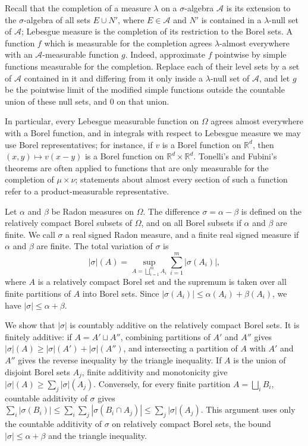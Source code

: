 Recall that the completion of a measure $\lambda$ on a $\sigma$-algebra $\mathcal A$ is its extension to the $\sigma$-algebra of all sets $E\cup N'$, where $E\in\mathcal A$ and $N'$ is contained in a $\lambda$-null set of $\mathcal A$; Lebesgue measure is the completion of its restriction to the Borel sets. A function $f$ which is measurable for the completion agrees $\lambda$-almost everywhere with an $\mathcal A$-measurable function $g$. Indeed, approximate $f$ pointwise by simple functions measurable for the completion. Replace each of their level sets by a set of $\mathcal A$ contained in it and differing from it only inside a $\lambda$-null set of $\mathcal A$, and let $g$ be the pointwise limit of the modified simple functions outside the countable union of these null sets, and $0$ on that union.

In particular, every Lebesgue measurable function on $\Omega$ agrees almost everywhere with a Borel function, and in integrals with respect to Lebesgue measure we may use Borel representatives; for instance, if $v$ is a Borel function on $\mathbb R^d$, then $(x,y)\mapsto v(x-y)$ is a Borel function on $\mathbb R^d\times\mathbb R^d$. Tonelli's and Fubini's theorems are often applied to functions that are only measurable for the completion of $\mu\times\nu$; statements about almost every section of such a function refer to a product-measurable representative.

Let $\alpha$ and $\beta$ be Radon measures on $\Omega$. The difference $\sigma=\alpha-\beta$ is defined on the relatively compact Borel subsets of $\Omega$, and on all Borel subsets if $\alpha$ and $\beta$ are finite. We call $\sigma$ a real signed Radon measure, and a finite real signed measure if $\alpha$ and $\beta$ are finite. The total variation of $\sigma$ is
\[
 |\sigma|(A)=\sup_{A=\bigsqcup_{i=1}^m A_i}\sum_{i=1}^m|\sigma(A_i)|,
\]
where $A$ is a relatively compact Borel set and the supremum is taken over all finite partitions of $A$ into Borel sets. Since $|\sigma(A_i)|\leq\alpha(A_i)+\beta(A_i)$, we have $|\sigma|\leq\alpha+\beta$.

We show that $|\sigma|$ is countably additive on the relatively compact Borel sets. It is finitely additive: if $A=A'\sqcup A''$, combining partitions of $A'$ and $A''$ gives $|\sigma|(A)\geq|\sigma|(A')+|\sigma|(A'')$, and intersecting a partition of $A$ with $A'$ and $A''$ gives the reverse inequality by the triangle inequality. If $A$ is the union of disjoint Borel sets $A_j$, finite additivity and monotonicity give $|\sigma|(A)\geq\sum_j|\sigma|(A_j)$. Conversely, for every finite partition $A=\bigsqcup_iB_i$, countable additivity of $\sigma$ gives $\sum_i|\sigma(B_i)|\leq\sum_i\sum_j|\sigma(B_i\cap A_j)|\leq\sum_j|\sigma|(A_j)$. This argument uses only the countable additivity of $\sigma$ on relatively compact Borel sets, the bound $|\sigma|\leq\alpha+\beta$ and the triangle inequality.

